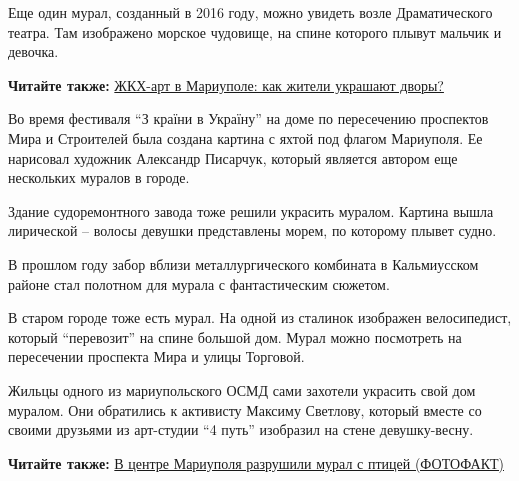 
Еще один мурал, созданный в 2016 году, можно увидеть возле Драматического
театра. Там изображено морское чудовище, на спине которого плывут мальчик и
девочка.


\textbf{Читайте также:} \href{https://mrpl.city/news/view/zhkh-art-v-mariupole-kak-zhiteli-ukrashayut-dvory-foto-plusvideo}{%
ЖКХ-арт в Мариуполе: как жители украшают дворы?}

Во время фестиваля \enquote{З країни в Україну} на доме по пересечению проспектов Мира
и Строителей была создана картина с яхтой под флагом Мариуполя. Ее нарисовал
художник Александр Писарчук, который является автором еще нескольких муралов в
городе.


Здание судоремонтного завода тоже решили украсить муралом. Картина вышла
лирической – волосы девушки представлены морем, по которому плывет судно.


В прошлом году забор вблизи металлургического комбината в Кальмиусском районе
стал полотном для мурала с фантастическим сюжетом.


В старом городе тоже есть мурал. На одной из сталинок изображен велосипедист,
который \enquote{перевозит} на спине большой дом. Мурал можно посмотреть на пересечении
проспекта Мира и улицы Торговой.


Жильцы одного из мариупольского ОСМД сами захотели украсить свой дом муралом.
Они обратились к активисту Максиму Светлову, который вместе со своими друзьями
из арт-студии \enquote{4 путь} изобразил на стене девушку-весну.


\textbf{Читайте также:} \href{https://mrpl.city/news/view/zhkh-art-v-mariupole-kak-zhiteli-ukrashayut-dvory-foto-plusvideo}{В центре Мариуполя разрушили мурал с птицей (ФОТОФАКТ)}

